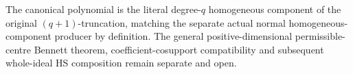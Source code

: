 The canonical polynomial is the literal degree-$q$ homogeneous
component of the original $(q+1)$-truncation, matching the separate
actual normal homogeneous-component producer by definition. The
general positive-dimensional permissible-centre Bennett theorem,
coefficient-cosupport compatibility and subsequent whole-ideal HS
composition remain separate and open.
